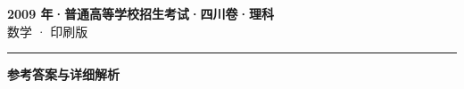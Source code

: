 \documentclass[zihao=5, a4paper]{ctexart}
\begin{document}
\begin{center}
  {\Large\bfseries 2009 年·普通高等学校招生考试·四川卷·理科}\\[4pt]
  {\large 数学 · 印刷版}
\end{center}
\medskip
{}

\par\bigskip\hrule\bigskip
{}
\begin{center}{\large\bfseries 参考答案与详细解析}\end{center}
\smallskip

\end{document}
